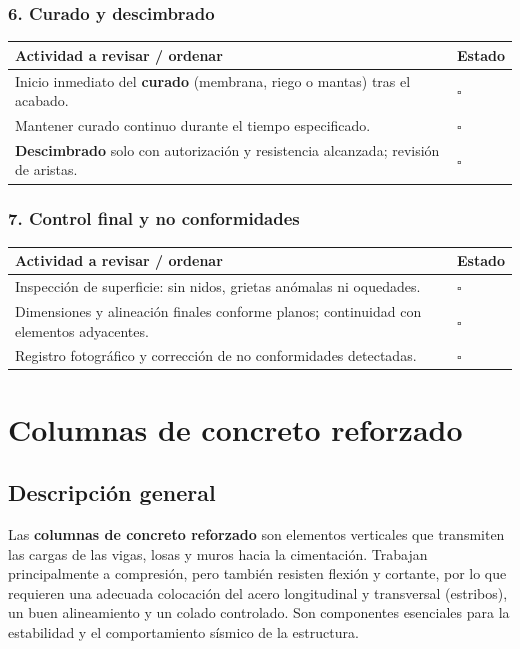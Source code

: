 \documentclass[12pt]{article}
\newcommand{\cbox}{\(\square\)} %
\begin{document}
	\subsubsection*{6. Curado y descimbrado}
	\begin{tabularx}{\linewidth}{>{\raggedright\arraybackslash}p{0.93\linewidth} >{\centering\arraybackslash}m{0.07\linewidth}}
		\toprule
		\textbf{Actividad a revisar / ordenar} & \textbf{Estado}\\
		\midrule
		Inicio inmediato del \textbf{curado} (membrana, riego o mantas) tras el acabado. & \cbox \\
		Mantener curado continuo durante el tiempo especificado. & \cbox \\
		\textbf{Descimbrado} solo con autorización y resistencia alcanzada; revisión de aristas. & \cbox \\
		\bottomrule
	\end{tabularx}
	
	\subsubsection*{7. Control final y no conformidades}
	\begin{tabularx}{\linewidth}{>{\raggedright\arraybackslash}p{0.93\linewidth} >{\centering\arraybackslash}m{0.07\linewidth}}
		\toprule
		\textbf{Actividad a revisar / ordenar} & \textbf{Estado}\\
		\midrule
		Inspección de superficie: sin nidos, grietas anómalas ni oquedades. & \cbox \\
		Dimensiones y alineación finales conforme planos; continuidad con elementos adyacentes. & \cbox \\
		Registro fotográfico y corrección de no conformidades detectadas. & \cbox \\
		\bottomrule
	\end{tabularx}
	
	
	
	
	
	
	\section{Columnas de concreto reforzado}
	
	\subsection*{Descripción general}
	Las \textbf{columnas de concreto reforzado} son elementos verticales que transmiten las cargas de las vigas, losas y muros hacia la cimentación. Trabajan principalmente a compresión, pero también resisten flexión y cortante, por lo que requieren una adecuada colocación del acero longitudinal y transversal (estribos), un buen alineamiento y un colado controlado. Son componentes esenciales para la estabilidad y el comportamiento sísmico de la estructura.
	
\end{document}
